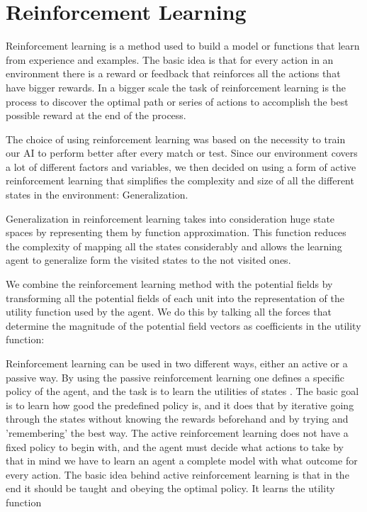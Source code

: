 \section{Reinforcement Learning}

	Reinforcement learning is a method used to build a model or functions that learn from experience and examples. The basic idea is that for every action in an environment there is a reward or feedback that reinforces all the actions that have bigger rewards. In a bigger scale the task of reinforcement learning is the process to discover the optimal path or series of actions to accomplish the best possible reward at the end of the process. 

	The choice of using reinforcement learning was based on the necessity to train our AI to perform better after every match or test. Since our environment covers a lot of different factors and variables, we then decided on using a form of active reinforcement learning that simplifies the complexity and size of all the different states in the environment: Generalization. 

	Generalization in reinforcement learning takes into consideration huge state spaces by representing them by function approximation. This function reduces the complexity of mapping all the states considerably and allows the learning agent to generalize form the visited states to the not visited ones. 

	We combine the reinforcement learning method with the potential fields by transforming all the potential fields of each unit into the representation of the utility function used by the agent. We do this by talking all the forces that determine the magnitude of the potential field vectors as coefficients in the utility function:
	
	
	Reinforcement learning can be used in two different ways, either an active or a passive way. By using the passive reinforcement learning one defines a specific policy of the agent, and the task is to learn the utilities of states \cite{rl}. The basic goal is to learn how good the predefined policy is, and it does that by iterative going through the states without knowing the rewards beforehand and by trying and 'remembering' the best way. The active reinforcement learning does not have a fixed policy to begin with, and the agent must decide what actions to take \cite[p771]{rl} by that in mind we have to learn an agent a complete model with what outcome for every action. The basic idea behind active reinforcement learning is that in the end it should be taught and obeying the optimal policy. It learns the utility function 

